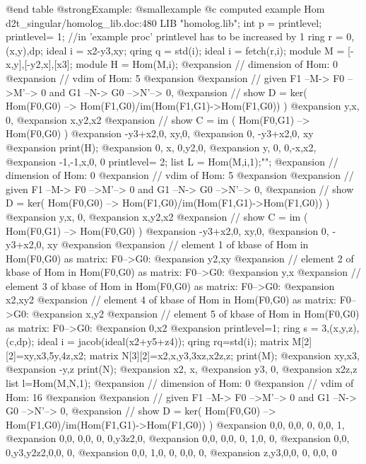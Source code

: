 @end table
@strong{Example:}
@smallexample
@c computed example Hom d2t_singular/homolog_lib.doc:480 
LIB "homolog.lib";
int p     = printlevel;
printlevel= 1;   //in 'example proc' printlevel has to be increased by 1
ring r    = 0,(x,y),dp;
ideal i   = x2-y3,xy;
qring q   = std(i);
ideal i   = fetch(r,i);
module M  = [-x,y],[-y2,x],[x3];
module H  = Hom(M,i);
@expansion{} // dimension of Hom:  0
@expansion{} // vdim of Hom:       5
@expansion{} 
@expansion{} // given  F1 --M-> F0 -->M'--> 0 and  G1 --N-> G0 -->N'--> 0,
@expansion{} // show D = ker( Hom(F0,G0) --> Hom(F1,G0)/im(Hom(F1,G1)->Hom(F1,G0)) )
@expansion{} y,x, 0,
@expansion{} x,y2,x2
@expansion{} // show C = im ( Hom(F0,G1) --> Hom(F0,G0) )
@expansion{} -y3+x2,0,     xy,0,
@expansion{} 0,     -y3+x2,0, xy
@expansion{} 
print(H);
@expansion{} 0, x, 0,y2,0, 
@expansion{} y, 0, 0,-x,x2,
@expansion{} -1,-1,x,0, 0  
printlevel= 2;
list L    = Hom(M,i,1);"";
@expansion{} // dimension of Hom:  0
@expansion{} // vdim of Hom:       5
@expansion{} 
@expansion{} // given  F1 --M-> F0 -->M'--> 0 and  G1 --N-> G0 -->N'--> 0,
@expansion{} // show D = ker( Hom(F0,G0) --> Hom(F1,G0)/im(Hom(F1,G1)->Hom(F1,G0)) )
@expansion{} y,x, 0,
@expansion{} x,y2,x2
@expansion{} // show C = im ( Hom(F0,G1) --> Hom(F0,G0) )
@expansion{} -y3+x2,0,     xy,0,
@expansion{} 0,     -y3+x2,0, xy
@expansion{} 
@expansion{} // element 1 of kbase of Hom in Hom(F0,G0) as matrix: F0-->G0:
@expansion{} y2,xy
@expansion{} // element 2 of kbase of Hom in Hom(F0,G0) as matrix: F0-->G0:
@expansion{} y,x
@expansion{} // element 3 of kbase of Hom in Hom(F0,G0) as matrix: F0-->G0:
@expansion{} x2,xy2
@expansion{} // element 4 of kbase of Hom in Hom(F0,G0) as matrix: F0-->G0:
@expansion{} x,y2
@expansion{} // element 5 of kbase of Hom in Hom(F0,G0) as matrix: F0-->G0:
@expansion{} 0,x2
@expansion{} 
printlevel=1;
ring s    = 3,(x,y,z),(c,dp);
ideal i   = jacob(ideal(x2+y5+z4));
qring rq=std(i);
matrix M[2][2]=xy,x3,5y,4z,x2;
matrix N[3][2]=x2,x,y3,3xz,x2z,z;
print(M);
@expansion{} xy,x3,
@expansion{} -y,z  
print(N);
@expansion{} x2, x,
@expansion{} y3, 0,
@expansion{} x2z,z 
list l=Hom(M,N,1);
@expansion{} // dimension of Hom:  0
@expansion{} // vdim of Hom:       16
@expansion{} 
@expansion{} // given  F1 --M-> F0 -->M'--> 0 and  G1 --N-> G0 -->N'--> 0,
@expansion{} // show D = ker( Hom(F0,G0) --> Hom(F1,G0)/im(Hom(F1,G1)->Hom(F1,G0)) )
@expansion{} 0,0, 0,0, 0,   0,0,   1,
@expansion{} 0,0, 0,0, 0,   0,y3z2,0,
@expansion{} 0,0, 0,0, 0,   1,0,   0,
@expansion{} 0,0, 0,y3,y2z2,0,0,   0,
@expansion{} 0,0, 1,0, 0,   0,0,   0,
@expansion{} z,y3,0,0, 0,   0,0,   0 
